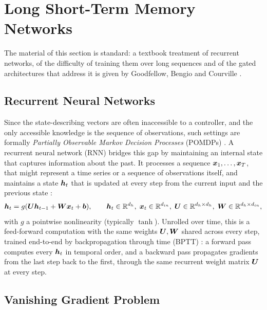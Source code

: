 \section{Long Short-Term Memory Networks}
\label{sec:lstm}

The material of this section is standard: a textbook treatment of recurrent networks, of the difficulty of training them over long sequences and of the gated architectures that address it is given by Goodfellow, Bengio and Courville \cite{goodfellow2016deep}.

\subsection{Recurrent Neural Networks}

Since the state-describing vectors are often inaccessible to a controller, and the only accessible knowledge is the sequence of observations, such settings are formally \emph{Partially Observable Markov Decision Processes} (POMDPs) \cite{kaelbling1998pomdp}. A recurrent neural network (RNN) bridges this gap by maintaining an internal state that captures information about the past. It processes a sequence $\bm{x}_1, \dots, \bm{x}_T$, that might represent a time series or a sequence of observations itself, and maintains a state $\bm{h}_t$ that is updated at every step from the current input and the previous state \cite{elman1990finding}:
\begin{equation}
\bm{h}_t = g(\bm{U} \bm{h}_{t-1} + \bm{W} \bm{x}_t + \bm{b}), \qquad \bm{h}_t \in \mathbb{R}^{d_h}, \; \bm{x}_t \in \mathbb{R}^{d_{in}}, \; \bm{U} \in \mathbb{R}^{d_h \times d_h}, \; \bm{W} \in \mathbb{R}^{d_h \times d_{in}},
\end{equation}
with $g$ a pointwise nonlinearity (typically $\tanh$). Unrolled over time, this is a feed-forward computation with the same weights $\bm{U}, \bm{W}$ shared across every step, trained end-to-end by backpropagation through time (BPTT) \cite{werbos1990backprop}: a forward pass computes every $\bm{h}_t$ in temporal order, and a backward pass propagates gradients from the last step back to the first, through the same recurrent weight matrix $\bm{U}$ at every step.

\subsection{Vanishing Gradient Problem}

